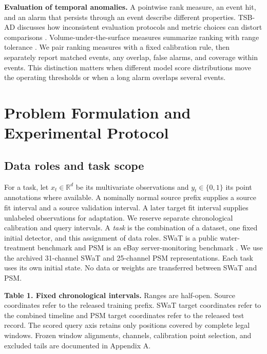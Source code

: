 \documentclass[
  american,
]{article}
\begin{document}
\textbf{Evaluation of temporal anomalies.} A pointwise rank measure, an
event hit, and an alarm that persists through an event describe
different properties. TSB-AD discusses how inconsistent evaluation
protocols and metric choices can distort comparisons \citep{tsbad2024}.
Volume-under-the-surface measures summarize ranking with range tolerance
\citep{vus2025}. We pair ranking measures with a fixed calibration rule,
then separately report matched events, any overlap, false alarms, and
coverage within events. This distinction matters when different model
score distributions move the operating thresholds or when a long alarm
overlaps several events.

\section{Problem Formulation and Experimental
Protocol}\label{problem-formulation-and-experimental-protocol}

\subsection{Data roles and task scope}\label{data-roles-and-task-scope}

For a task, let \(x_t\in\mathbb{R}^d\) be its multivariate observations
and \(y_t\in\{0,1\}\) its point annotations where available. A nominally
normal source prefix supplies a source fit interval and a source
validation interval. A later target fit interval supplies unlabeled
observations for adaptation. We reserve separate chronological
calibration and query intervals. A \emph{task} is the combination of a
dataset, one fixed initial detector, and this assignment of data roles.
SWaT is a public water-treatment benchmark and PSM is an eBay
server-monitoring benchmark \citep{swat2016, psm2021}. We use the
archived 31-channel SWaT and 25-channel PSM representations. Each task
uses its own initial state. No data or weights are transferred between
SWaT and PSM.

\textbf{Table 1. Fixed chronological intervals.} Ranges are half-open.
Source coordinates refer to the released training prefix. SWaT target
coordinates refer to the combined timeline and PSM target coordinates
refer to the released test record. The scored query axis retains only
positions covered by complete legal windows. Frozen window alignments,
channels, calibration point selection, and excluded tails are documented
in Appendix A.
\end{document}
